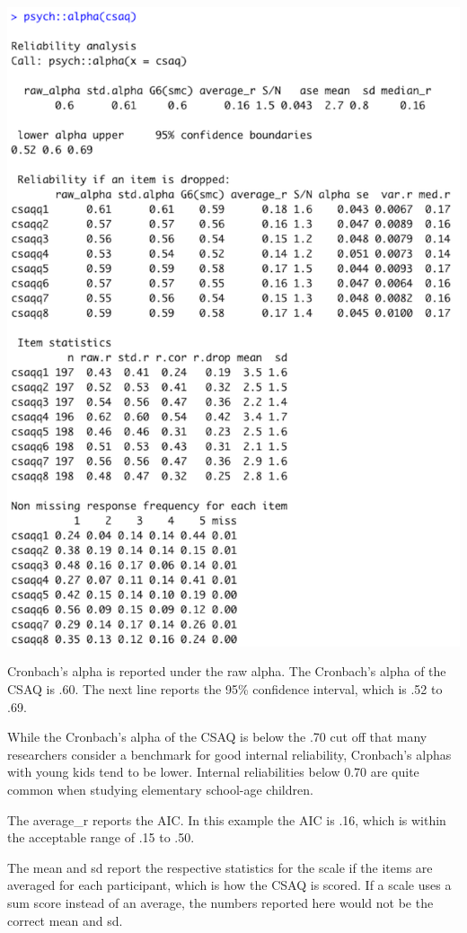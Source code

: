 \documentclass[
]{book}
\begin{document}
\includegraphics{img/4R.3.png}

Cronbach's alpha is reported under the raw alpha. The Cronbach's alpha of the CSAQ is .60. The next line reports the 95\% confidence interval, which is .52 to .69.

While the Cronbach's alpha of the CSAQ is below the .70 cut off that many researchers consider a benchmark for good internal reliability, Cronbach's alphas with young kids tend to be lower. Internal reliabilities below 0.70 are quite common when studying elementary school-age children.

The average\_r reports the AIC. In this example the AIC is .16, which is within the acceptable range of .15 to .50.

The mean and sd report the respective statistics for the scale if the items are averaged for each participant, which is how the CSAQ is scored. If a scale uses a sum score instead of an average, the numbers reported here would not be the correct mean and sd.
\end{document}
